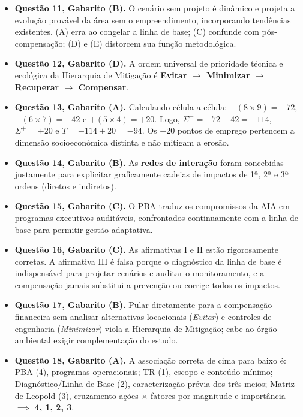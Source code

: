 \begin{boxGabarito}
  \begin{itemize}[leftmargin=1.5em, itemsep=3.5pt]
    \item \textbf{Questão 11, Gabarito (B).} O cenário sem projeto é dinâmico e projeta a evolução provável da área sem o empreendimento, incorporando tendências existentes. (A) erra ao congelar a linha de base; (C) confunde com pós-compensação; (D) e (E) distorcem sua função metodológica.
    \item \textbf{Questão 12, Gabarito (D).} A ordem universal de prioridade técnica e ecológica da Hierarquia de Mitigação é \textbf{Evitar $\to$ Minimizar $\to$ Recuperar $\to$ Compensar}.
    \item \textbf{Questão 13, Gabarito (A).} Calculando célula a célula: $-(8 \times 9) = -72$, $-(6 \times 7) = -42$ e $+(5 \times 4) = +20$. Logo, $\Sigma^{-} = -72 - 42 = -114$, $\Sigma^{+} = +20$ e $T = -114 + 20 = -94$. Os $+20$ pontos de emprego pertencem a dimensão socioeconômica distinta e não mitigam a erosão.
    \item \textbf{Questão 14, Gabarito (B).} As \textbf{redes de interação} foram concebidas justamente para explicitar graficamente cadeias de impactos de 1ª, 2ª e 3ª ordens (diretos e indiretos).
    \item \textbf{Questão 15, Gabarito (C).} O PBA traduz os compromissos da AIA em programas executivos auditáveis, confrontados continuamente com a linha de base para permitir gestão adaptativa.
    \item \textbf{Questão 16, Gabarito (C).} As afirmativas I e II estão rigorosamente corretas. A afirmativa III é falsa porque o diagnóstico da linha de base é indispensável para projetar cenários e auditar o monitoramento, e a compensação jamais substitui a prevenção ou corrige todos os impactos.
    \item \textbf{Questão 17, Gabarito (B).} Pular diretamente para a compensação financeira sem analisar alternativas locacionais (\textit{Evitar}) e controles de engenharia (\textit{Minimizar}) viola a Hierarquia de Mitigação; cabe ao órgão ambiental exigir complementação do estudo.
    \item \textbf{Questão 18, Gabarito (A).} A associação correta de cima para baixo é: PBA (4), programas operacionais; TR (1), escopo e conteúdo mínimo; Diagnóstico/Linha de Base (2), caracterização prévia dos três meios; Matriz de Leopold (3), cruzamento ações $\times$ fatores por magnitude e importância $\implies$ \textbf{4, 1, 2, 3}.
  \end{itemize}
\end{boxGabarito}


